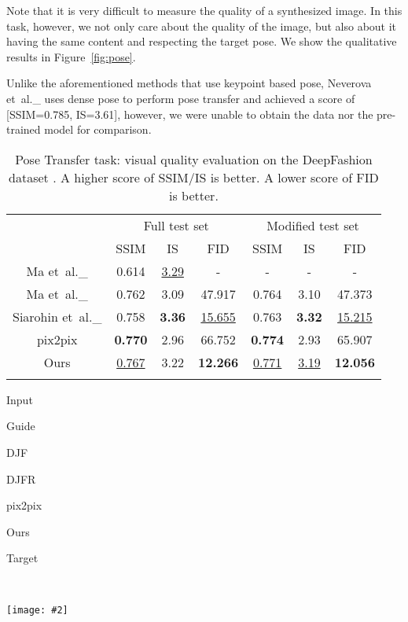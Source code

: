 \documentclass[10pt,twocolumn,letterpaper]{article}
\def\etal{et~al.\_}			  \def\eg{e.g.,~}               \def\ie{i.e.,~}               \def\etc{etc}                 \def\cf{cf.~}                 \def\viz{viz.~}               \def\vs{vs.~}
\newlength\secmargin
\newlength\figcapmargin
\newlength\tabmargin
\newcommand{\mpage}[2]
{
\begin{minipage}{#1\linewidth}\centering
#2
\end{minipage}
}
\newcommand{\figref}[1]{Figure~\ref{fig:#1}}
\newcommand{\mfigure}[2]
{
\begin{minipage}{#1\linewidth}\centering
\texttt{[image: \#2]}
\end{minipage}
}
\begin{document}
Note that it is very difficult to measure the quality of a synthesized image. In this task, however, we not only care about the quality of the image, but also about it having the same content and respecting the target pose. 
We show the qualitative results in \figref{pose}. 

Unlike the aforementioned methods that use keypoint based pose, Neverova \etal\cite{neverova2018dense} uses dense pose to perform pose transfer and achieved a score of [SSIM=0.785, IS=3.61], however, we were unable to obtain the data nor the pre-trained model for comparison.

\begin{table}[t]\setlength{\tabcolsep}{4pt}
	\centering\footnotesize
	\caption{Pose Transfer task: visual quality evaluation on the DeepFashion dataset \cite{liu2016deepfashion}. A higher score of SSIM/IS is better. A lower score of FID is better.}
	\begin{tabular}{ccccccc}
		\toprule
    	 &   \multicolumn{3}{c}{Full test set} & \multicolumn{3}{c}{Modified test set} \\
		  &  SSIM & IS & FID & SSIM & IS &FID \\
		\midrule
        Ma \etal\cite{ma2018disentangled}               & 0.614 & \underline{3.29} & - & - & - & -\\
        Ma \etal\cite{ma2017pose}                       & 0.762 & 3.09   & 47.917 & 0.764 & 3.10 & 47.373\\
        Siarohin \etal\cite{siarohin2018deformable}     & 0.758 & \textbf{3.36} & \underline{15.655} & 0.763 & \textbf{3.32} & \underline{15.215}\\
        \midrule
        pix2pix \cite{isola2017image}           & \textbf{0.770} & 2.96 & 66.752 & \textbf{0.774} & 2.93 & 65.907\\
        Ours    & \underline{0.767} & 3.22    & \textbf{12.266} & \underline{0.771} & \underline{3.19} & \textbf{12.056}\\
        \bottomrule
		\vspace{\tabmargin}
		\label{tab:pose}
	\end{tabular}
\end{table}


\begin{figure*}[t]
\centering

\mpage{0.13}{Input} \hfill
\mpage{0.13}{Guide}\hfill
\mpage{0.13}{DJF }\hfill
\mpage{0.13}{DJFR }\hfill
\mpage{0.13}{pix2pix } \hfill
\mpage{0.13}{Ours} \hfill
\mpage{0.13}{Target} \\

\mfigure{0.99}{{fig/depth_results.pdf}}\hfill

\vspace{\figcapmargin}
\label{fig:depth}
\end{figure*} 
\vspace{\secmargin}
\end{document}
